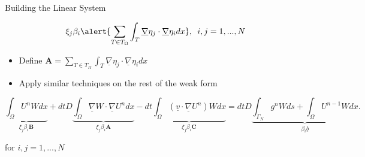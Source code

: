 \documentclass[10pt]{beamer}
\begin{document}
\begin{frame}{Building the Linear System}\label{BuildLinearSystem}

\begin{equation}
\xi_{j}\beta_{i}\alert{\sum_{T \in T_{\Omega}}\int_{T} \underline{\nabla} \eta_{j} \cdot \underline{\nabla}\eta_{i} dx}, \texttt{ } i,j=1,...,N
\end{equation}

\begin{itemize}
\item Define $\mathbf{A} = \sum_{T \in T_{\Omega}}\int_{T} \underline{\nabla} \eta_{j} \cdot \underline{\nabla}\eta_{i} dx$
\end{itemize}

\begin{itemize}
\item Apply similar techniques on the rest of the weak form
\end{itemize}

\footnotesize
\begin{equation}
\underbrace{\int_{\Omega}U^{n}W dx}_{ \xi_{j}\beta_{i}\mathbf{B}} +dtD\underbrace{\int_{\Omega}\underline{\nabla}W \cdot \underline{\nabla} U^{n} dx}_{ \xi_{j}\beta_{i}\mathbf{A}}-dt\underbrace{\int_{\Omega}\left(\underline{v}\cdot \underline{\nabla}U^{n}\right)W dx}_{ \xi_{j}\beta_{i}\mathbf{C}}=dtD\underbrace{\int_{\Gamma_{N}}g^{n}W ds+ \int_{\Omega} U^{n-1}W dx}_{ \beta_{i}\underline{b}}.
\end{equation}

\normalsize
for $i,j=1,...,N$
\hyperlink{Questions}{}
\end{frame}
\end{document}

